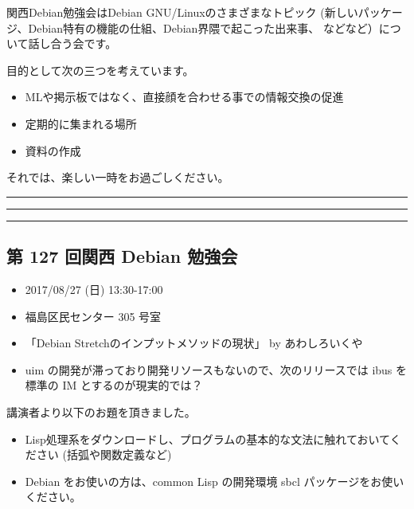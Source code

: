 \documentclass[mingoth,a4paper]{jsarticle}
\begin{document}
\vspace{1em}

関西Debian勉強会はDebian GNU/Linuxのさまざまなトピック
(新しいパッケージ、Debian特有の機能の仕組、Debian界隈で起こった出来事、
などなど）について話し合う会です。

目的として次の三つを考えています。
\begin{itemize}
\item MLや掲示板ではなく、直接顔を合わせる事での情報交換の促進
\item 定期的に集まれる場所
\item 資料の作成
\end{itemize}

それでは、楽しい一時をお過ごしください。

\newpage

\begin{minipage}[b]{0.2\hsize}
  {}
\end{minipage}
\begin{minipage}[b]{0.8\hsize}
\hrule
\vspace{2mm}
\hrule
\setcounter{tocdepth}{1}
\tableofcontents
\vspace{2mm}
\hrule
\end{minipage}


\subsection{第 127 回関西 Debian 勉強会 }
\begin{itemize}
  \item 2017/08/27 (日) 13:30-17:00
  \item 福島区民センター 305 号室
  \item「Debian Stretchのインプットメソッドの現状」 by あわしろいくや 
  \item uim の開発が滞っており開発リソースもないので、次のリリースでは ibus を標準の IM とするのが現実的では？ 
\end{itemize}


講演者より以下のお題を頂きました。
\begin{itemize}
\item Lisp処理系をダウンロードし、プログラムの基本的な文法に触れておいてください (括弧や関数定義など)
\item Debian をお使いの方は、common Lisp の開発環境 sbcl パッケージをお使いください。 
\end{itemize}
\end{document}
